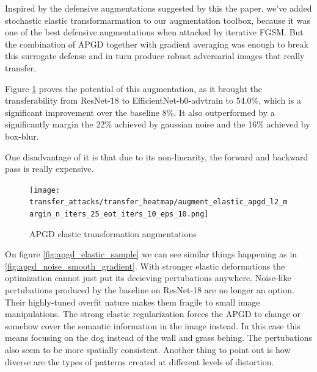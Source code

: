 Inspired by the defensive augmentations suggested by this the paper, we've added stochastic elastic transformarmation to our augmentation toolbox, because it was one of the best defensive augmentations when attacked by iterative FGSM. But the combination of APGD together with gradient averaging was enough to break this surrogate defense and in turn produce robust adversarial images that really transfer.

Figure \ref{fig:apgd_elastic} proves the potential of this augmentation, as it brought the transferability from ResNet-18 to EfficientNet-b0-advtrain to 54.0\%, which is a significant improvement over the baseline 8\%. It also outperformed by a significantly margin the 22\% achieved by gaussian noise and the 16\% achieved by box-blur.

One disadvantage of it is that due to its non-linearity, the forward and backward pass is really expensive.


\begin{figure}
    \centering
    \texttt{[image: transfer\_attacks/transfer\_heatmap/augment\_elastic\_apgd\_l2\_margin\_n\_iters\_25\_eot\_iters\_10\_eps\_10.png]}
    \caption{APGD elastic transformation augmentations}
    \label{fig:apgd_elastic}
\end{figure}


On figure \ref{fig:apgd_elastic_sample} we can see similar things happening as in \ref{fig:apgd_noise_smooth_gradient}. With stronger elastic deformations the optimization cannot just put its decieving pertubations anywhere. Noise-like pertubations produced by the baseline on ResNet-18 are no longer an option. Their highly-tuned overfit nature makes them fragile to small image manipulations. The strong elastic regularization forces the APGD to change or somehow cover the semantic information in the image instead. In this case this means focusing on the dog instead of the wall and grass behing. The pertubations also seem to be more spatially consistent. Another thing to point out is how diverse are the types of patterns created at different levels of distortion.

